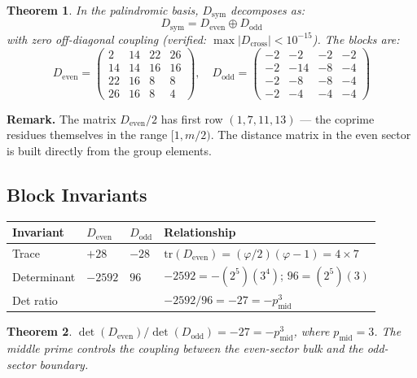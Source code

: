 \documentclass[11pt,letterpaper]{article}
\newtheorem{theorem}{Theorem}[section]
\theoremstyle{definition}
\begin{document}
\begin{theorem}
In the palindromic basis, $D_{\text{sym}}$ decomposes as:
\[
D_{\text{sym}} = D_{\text{even}} \oplus D_{\text{odd}}
\]
with zero off-diagonal coupling (verified: $\max|D_{\text{cross}}| < 10^{-15}$). The blocks are:
\[
D_{\text{even}} = \begin{pmatrix} 2 & 14 & 22 & 26 \\ 14 & 14 & 16 & 16 \\ 22 & 16 & 8 & 8 \\ 26 & 16 & 8 & 4 \end{pmatrix},
\quad
D_{\text{odd}} = \begin{pmatrix} -2 & -2 & -2 & -2 \\ -2 & -14 & -8 & -4 \\ -2 & -8 & -8 & -4 \\ -2 & -4 & -4 & -4 \end{pmatrix}
\]
\end{theorem}

\textbf{Remark.} The matrix $D_{\text{even}}/2$ has first row $(1, 7, 11, 13)$ --- the coprime residues themselves in the range $[1, m/2)$. The distance matrix in the even sector is built directly from the group elements.

\subsection{Block Invariants}

\begin{center}
\begin{tabular}{@{}llll@{}}
\toprule
Invariant & $D_{\text{even}}$ & $D_{\text{odd}}$ & Relationship \\
\midrule
Trace & $+28$ & $-28$ & $\text{tr}(D_{\text{even}}) = (\varphi/2)(\varphi - 1) = 4 \times 7$ \\
Determinant & $-2592$ & $96$ & $-2592 = -(2^5)(3^4)$;\; $96 = (2^5)(3)$ \\
Det ratio & & & $-2592/96 = -27 = -p_{\text{mid}}^3$ \\
\bottomrule
\end{tabular}
\end{center}

\begin{theorem}
$\det(D_{\text{even}})/\det(D_{\text{odd}}) = -27 = -p_{\text{mid}}^3$, where $p_{\text{mid}} = 3$. The middle prime controls the coupling between the even-sector bulk and the odd-sector boundary.
\end{theorem}
\end{document}
